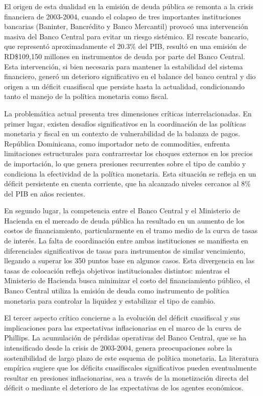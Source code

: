 \documentclass[
  authoryear,
  review]{elsarticle}
\begin{document}
El origen de esta dualidad en la emisión de deuda pública se remonta a
la crisis financiera de 2003-2004, cuando el colapso de tres importantes
instituciones bancarias (Baninter, Bancrédito y Banco Mercantil) provocó
una intervención masiva del Banco Central para evitar un riesgo
sistémico. El rescate bancario, que representó aproximadamente el 20.3\%
del PIB, resultó en una emisión de RD\$109,150 millones en instrumentos
de deuda por parte del Banco Central. Esta intervención, si bien
necesaria para mantener la estabilidad del sistema financiero, generó un
deterioro significativo en el balance del banco central y dio origen a
un déficit cuasifiscal que persiste hasta la actualidad, condicionando
tanto el manejo de la política monetaria como fiscal.
\citep{oecd_mercado_2012}

La problemática actual presenta tres dimensiones críticas
interrelacionadas. En primer lugar, existen desafíos significativos en
la coordinación de las políticas monetaria y fiscal en un contexto de
vulnerabilidad de la balanza de pagos. República Dominicana, como
importador neto de commodities, enfrenta limitaciones estructurales para
contrarrestar los choques externos en los precios de importación, lo que
genera presiones recurrentes sobre el tipo de cambio y condiciona la
efectividad de la política monetaria. Esta situación se refleja en un
déficit persistente en cuenta corriente, que ha alcanzado niveles
cercanos al 8\% del PIB en años recientes.

En segundo lugar, la competencia entre el Banco Central y el Ministerio
de Hacienda en el mercado de deuda pública ha resultado en un aumento de
los costos de financiamiento, particularmente en el tramo medio de la
curva de tasas de interés. La falta de coordinación entre ambas
instituciones se manifiesta en diferenciales significativos de tasas
para instrumentos de similar vencimiento, llegando a superar los 350
puntos base en algunos casos. Esta divergencia en las tasas de
colocación refleja objetivos institucionales distintos: mientras el
Ministerio de Hacienda busca minimizar el costo del financiamiento
público, el Banco Central utiliza la emisión de deuda como instrumento
de política monetaria para controlar la liquidez y estabilizar el tipo
de cambio. \citep{oecd_mercado_2012}

El tercer aspecto crítico concierne a la evolución del déficit
cuasifiscal y sus implicaciones para las expectativas inflacionarias en
el marco de la curva de Phillips. La acumulación de pérdidas operativas
del Banco Central, que se ha intensificado desde la crisis de 2003-2004,
genera preocupaciones sobre la sostenibilidad de largo plazo de este
esquema de política monetaria. La literatura empírica sugiere que los
déficits cuasifiscales significativos pueden eventualmente resultar en
presiones inflacionarias, sea a través de la monetización directa del
déficit o mediante el deterioro de las expectativas de los agentes
económicos. \citep{cruz-rodriguez_deficit_2006}
\end{document}
